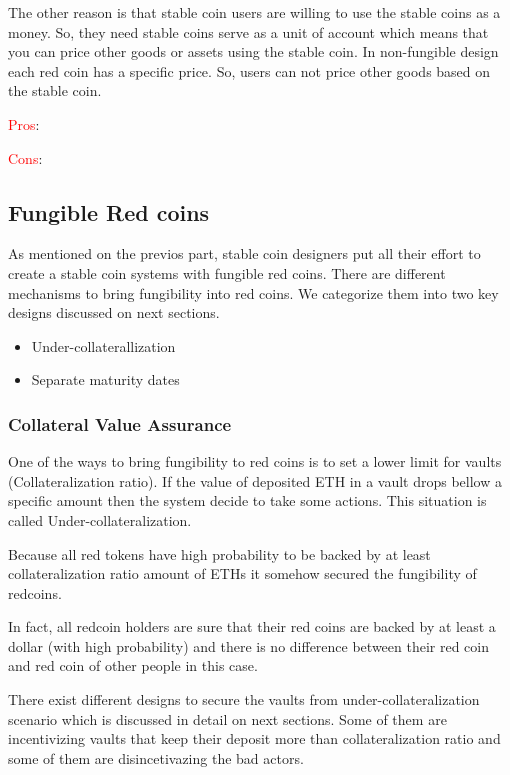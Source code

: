 The other reason is that stable coin users are willing to use the stable coins as a money. So, they need stable coins serve as a unit of account which means that you can price other goods or assets using the stable coin. In non-fungible design each red coin has a specific price. So, users can not price other goods based on the stable coin.

\textcolor{red}{Pros}:

\textcolor{red}{Cons}:


\subsection{Fungible Red coins}
As mentioned on the previos part, stable coin designers put all their effort to create a stable coin systems with fungible red coins. There are different mechanisms to bring fungibility into red coins. We categorize them into two key designs discussed on next sections.

\begin{itemize}
  \item Under-collaterallization
  \item Separate maturity dates
\end{itemize} 


\subsubsection{Collateral Value Assurance}

One of the ways to bring fungibility to red coins is to set a lower limit for vaults (Collateralization ratio). If the value of deposited ETH in a vault drops bellow a specific amount then the system decide to take some actions. This situation is called Under-collateralization.

Because all red tokens have high probability to be backed by at least collateralization ratio amount of ETHs it somehow secured the fungibility of redcoins.
 
In fact, all redcoin holders are sure that their red coins are backed by at least a dollar (with high probability) and there is no difference between their red coin and red coin of other people in this case.

There exist different designs to secure the vaults from under-collateralization scenario which is discussed in detail on next sections. Some of them are incentivizing vaults that keep their deposit more than collateralization ratio and some of them are disincetivazing the bad actors.

